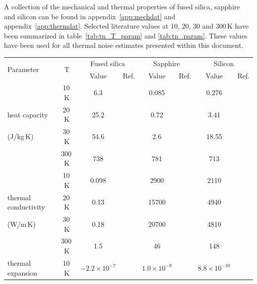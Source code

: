 A collection of the mechanical and thermal properties of fused silica, sapphire and silicon can be found in appendix~\ref{app:mechdat} and appendix~\ref{app:thermdat}. Selected literature values at 10, 20, 30 and 300\,K have been summarized in table~\ref{tab:tn_T_param} and \ref{tab:tn_param}. These values have been used for all thermal noise estimates presented within this document.
 
\begin{table}[!t]
\begin{center}
\begin{tabular}{|l|c|c|c|c|c|c|c|} \hline
\multirow{2}{*}{Parameter} & \multirow{2}{*}{T} & \multicolumn{2}{c|}{Fused silica} & \multicolumn{2}{c|}{Sapphire} & \multicolumn{2}{c|}{Silicon} \\ 
					    &        & Value & Ref. & Value & Ref. & Value & Ref. \\ \hline
 				      & 10\,K  & 6.3 & \cite{Touloukian1970_Cp_nonmetal} & 0.085 & \cite{White1994} & 0.276 & \cite{Hull1999} \\
heat capacity & 20\,K  & 25.2 & \cite{Touloukian1970_Cp_nonmetal} & 0.72 & \cite{White1994} & 3.41 & \cite{Hull1999}  \\
(J/kg\,K)     & 30\,K  & 54.6 & \cite{Touloukian1970_Cp_nonmetal} & 2.6 & \cite{White1994} & 18.55 & \cite{Hull1999} \\ 
						  & 300\,K & 738 & \cite{Touloukian1970_Cp_nonmetal} & 781 & \cite{White1994} & 713 & \cite{Hull1999} \\ \hline
     					& 10\,K & 0.098 & \cite{Touloukian1970_kappa_nonmetal} & 2900 & \cite{Touloukian1970_kappa_nonmetal} & 2110 & \cite{Touloukian1970_kappa_metal} \\ 
thermal conductivity  & 20\,K  & 0.13 & \cite{Touloukian1970_kappa_nonmetal} & 15700 & \cite{Touloukian1970_kappa_nonmetal} & 4940 & \cite{Touloukian1970_kappa_metal}  \\ 					  
(W/m\,K)  		& 30\,K & 0.18 & \cite{Touloukian1970_kappa_nonmetal} & 20700  & \cite{Touloukian1970_kappa_nonmetal} & 4810 & \cite{Touloukian1970_kappa_metal} \\ 
							& 300\,K & 1.5 & \cite{Touloukian1970_kappa_nonmetal} & 46 & \cite{Touloukian1970_kappa_nonmetal} & 148 & \cite{Touloukian1970_kappa_metal} \\ \hline
thermal expansion & 10\,K & $\mathrm{-2.2\times10^{-7}} $ & \cite{Touloukian1970_alpha_nonmetal} & $\mathrm{1.0\times10^{-9}}$ & \cite{White1994} & $\mathrm{8.8\times10^{-10}} $ & \cite{Hull1999} \\ 

\end{tabular}
\end{center}
\end{table}
